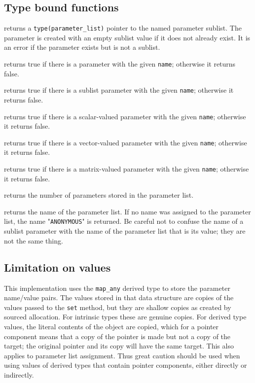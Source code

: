 \documentclass[11pt]{article}
\begin{document}
\subsection{Type bound functions}
\begin{description}[style=nextline]\setlength{\itemsep}{0pt}
\item[\texttt{sublist(name \Lbr,stat \Lbr,errmsg\Rbr\Rbr)}]
  returns a \texttt{type(parameter_list)} pointer to the named parameter
  sublist.  The parameter is created with an empty sublist value if it
  does not already exist.  It is an error if the parameter exists but is
  not a sublist.
\item[\texttt{is_parameter(name)}]
  returns true if there is a parameter with the given \texttt{name};
  otherwise it returns false.
\item[\texttt{is_sublist(name)}]
  returns true if there is a sublist parameter with the given \texttt{name};
  otherwise it returns false.
\item[\texttt{is_scalar(name)}]
  returns true if there is a scalar-valued parameter with the given \texttt{name};
  otherwise it returns false.
\item[\texttt{is_vector(name)}]
  returns true if there is a vector-valued parameter with the given \texttt{name};
  otherwise it returns false.
\item[\texttt{is_matrix(name)}]
  returns true if there is a matrix-valued parameter with the given \texttt{name};
  otherwise it returns false.
\item[\texttt{count()}]
  returns the number of parameters stored in the parameter list.
\item[\texttt{name()}]
  returns the name of the parameter list.  If no name was assigned to the
  parameter list, the name "\texttt{ANONYMOUS}" is returned.  Be careful not
  to confuse the name of a sublist parameter with the name of the parameter
  list that is its value; they are not the same thing.
\end{description}

\subsection{Limitation on values}
This implementation uses the \texttt{map_any} derived type to store the
parameter name/value pairs.  The values stored in that data structure are
copies of the values passed to the \texttt{set} method, but they are shallow
copies as created by sourced allocation.  For intrinsic types these are
genuine copies.  For derived type values, the literal contents of the object
are copied, which for a pointer component means that a copy of the pointer
is made but not a copy of the target; the original pointer and its copy will
have the same target.  This also applies to parameter list assignment.
Thus great caution should be used when using values of derived types that
contain pointer components, either directly or indirectly.
\end{document}
